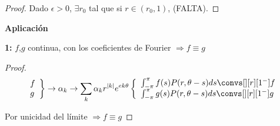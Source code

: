\begin{itemize}
\begin{theorem}
\begin{proof}
					Dado $\epsilon > 0$, $\exists r_0$ tal que si $r \in (r_0,1)$, (FALTA).

				\end{proof}

			\end{theorem}

			\textbf{Aplicación}

			\textbf{1:} $f$,$g$ continua, con los  coeficientes de Fourier $\Rightarrow f \equiv g$

			\begin{proof}
				\[
					\left. \begin{array}{l}
					f \\
					g
					\end{array} \right\} \rightarrow \alpha_k \rightarrow \sum_k \alpha_k r^{|k|} e^{ek\theta} \left\{ \begin{array}{l}
						\int^{\pi}_{-\pi} f(s) P(r, \theta - s)ds \convs[][r][1^-] f \\
						\int^{\pi}_{-\pi} g(s) P(r, \theta - s)ds \convs[][r][1^-] g
					\end{array} \right.
				\]

				Por unicidad del límite $\Rightarrow f \equiv g$
			\end{proof}




		\end{itemize}

